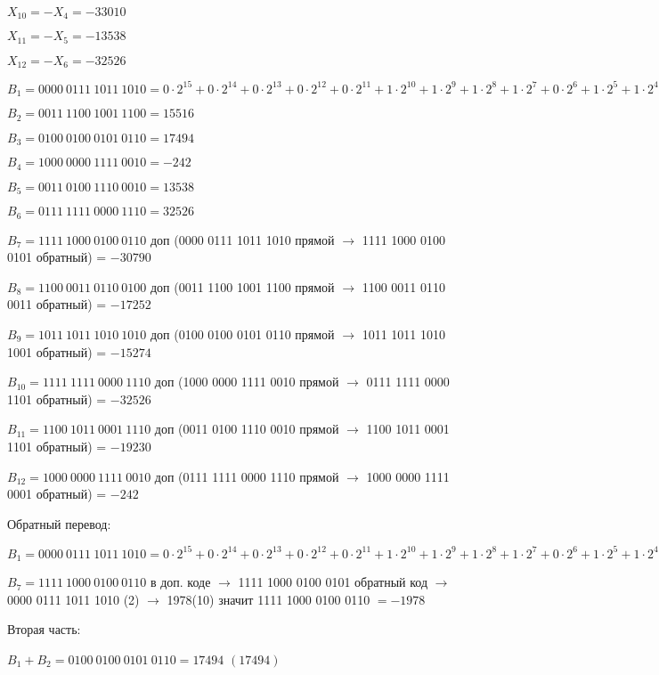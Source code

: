 \documentclass{article}
\begin{document}
$X_{10} = -X_4 = -33010$

$X_{11} = -X_5 = -13538$

$X_{12} = -X_6 = -32526$

$B_1=0000\:0111\:1011\:1010 = 0\cdot 2^{15} + 0\cdot 2^{14} + 0\cdot 2^{13} + 0\cdot 2^{12} + 0\cdot 2^{11} + 1\cdot 2^{10} + 1\cdot 2^9 + 1\cdot 2^8 + 1\cdot 2^7 + 0\cdot 2^6 + 1\cdot 2^5 + 1\cdot 2^4 + 1\cdot 2^3 + 0\cdot 2^2 + 1\cdot 2^1 + 0\cdot 2^0 = 1978$

$B_2=0011\:1100\:1001\:1100 = 15516$

$B_3=0100\:0100\:0101\:0110 = 17494$

$B_4=1000\:0000\:1111\:0010 = -242$

$B_5=0011\:0100\:1110\:0010 = 13538$

$B_6=0111\:1111\:0000\:1110 = 32526$

$B_7=1111\:1000\:0100\:0110$ доп (0000 0111 1011 1010 прямой $\rightarrow$ 1111 1000 0100 0101 обратный) = $-30790$

$B_8=1100\:0011\:0110\:0100$ доп (0011 1100 1001 1100 прямой $\rightarrow$ 1100 0011 0110 0011 обратный) = $-17252$

$B_9=1011\:1011\:1010\:1010$ доп (0100 0100 0101 0110 прямой $\rightarrow$ 1011 1011 1010 1001 обратный) = $-15274$

$B_{10}=1111\:1111\:0000\:1110$ доп (1000 0000 1111 0010 прямой $\rightarrow$ 0111 1111 0000 1101 обратный) = $-32526$

$B_{11}=1100\:1011\:0001\:1110$ доп (0011 0100 1110 0010 прямой $\rightarrow$ 1100 1011 0001 1101 обратный) = $-19230$

$B_{12}=1000\:0000\:1111\:0010$ доп (0111 1111 0000 1110 прямой $\rightarrow$ 1000 0000 1111 0001 обратный) = $-242$

Обратный перевод:

$B_1=0000\:0111\:1011\:1010 = 0\cdot 2^{15} + 0\cdot 2^{14} + 0\cdot 2^{13} + 0\cdot 2^{12} + 0\cdot 2^{11} + 1\cdot 2^{10} + 1\cdot 2^9 + 1\cdot 2^8 + 1\cdot 2^7 + 0\cdot 2^6 + 1\cdot 2^5 + 1\cdot 2^4 + 1\cdot 2^3 + 0\cdot 2^2 + 1\cdot 2^1 + 0\cdot 2^0 = 1024 + 512 + 256 + 128 + 32 + 16 + 8 + 2 = 1978$

$B_7=1111\:1000\:0100\:0110$ в доп. коде $\rightarrow$ 1111 1000 0100 0101 обратный код $\rightarrow$ 0000 0111 1011 1010 (2) $\rightarrow$ 1978(10) значит 1111 1000 0100 0110 $= -1978$

Вторая часть:

$B_1 + B_2 = 0100\:0100\:0101\:0110 = 17494$ $(17494)$
\end{document}
